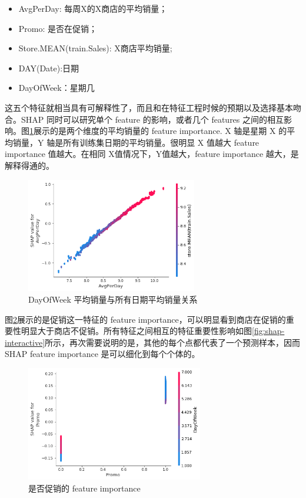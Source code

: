 \documentclass[a4paper]{article}
\begin{document}
\begin{itemize}
    \item AvgPerDay: 每周X的X商店的平均销量；
    \item Promo: 是否在促销；
    \item Store.MEAN(train.Sales): X商店平均销量;
    \item DAY(Date):日期
    \item DayOfWeek：星期几
\end{itemize}

这五个特征就相当具有可解释性了，而且和在特征工程时候的预期以及选择基本吻合。SHAP 同时可以研究单个 feature 的影响，或者几个 features 之间的相互影响。图\ref{fig:shap-avg}展示的是两个维度的平均销量的 feature importance. X 轴是星期 X 的平均销量，Y 轴是所有训练集日期的平均销量。很明显 X 值越大 feature importance 值越大。在相同 X值情况下，Y值越大，feature importance 越大，是解释得通的。
\begin{figure}[ht]
 \centering
 \includegraphics[height=5cm,width=\textwidth]{images/shap-avg}
 \caption{DayOfWeek 平均销量与所有日期平均销量关系}
 \label{fig:shap-avg}
\end{figure}

图\ref{fig:shap-promo}展示的是促销这一特征的 feature  importance，可以明显看到商店在促销的重要性明显大于商店不促销。所有特征之间相互的特征重要性影响如图\ref{fig:shap-interactive}所示，再次需要说明的是，其他的每个点都代表了一个预测样本，因而 SHAP feature importance 是可以细化到每个个体的。
\begin{figure}[ht]
 \centering
 \includegraphics[height=5cm,width=\textwidth]{images/shap-promo}
 \caption{是否促销的 feature importance}
 \label{fig:shap-promo}
\end{figure}
\end{document}
